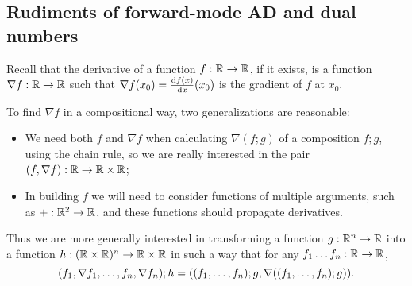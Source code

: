 

\subsection{Rudiments of forward-mode AD and dual numbers}

Recall that the derivative of a function $f:\mathbb{R}\to \mathbb{R}$, if it exists, is a function
$\nabla f:\mathbb{R}\to \mathbb{R}$ such that $\nabla f(x_0)=\frac {\mathop{}\!\mathrm{d} f(x)}{\mathop{}\!\mathrm{d} x}(x_0)$ is the gradient of $f$ at $x_0$. 

To find $\nabla f$ in a compositional way, two generalizations are reasonable:
\begin{itemize}
\item We need both $f$ and $\nabla f$ when calculating $\nabla (f;g)$
of a composition $f;g$, using the chain rule, so we are really interested in the pair $(f,\nabla f):\mathbb{R}\to \mathbb{R}\times \mathbb{R}$;
\item In building $f$ we will need to consider functions of multiple arguments, such as $+:\mathbb{R}^2\to \mathbb{R}$, and these functions should propagate derivatives.
\end{itemize}
Thus we are more generally interested in transforming a function $g:\mathbb{R}^n\to \mathbb{R}$ into a function
$h:(\mathbb{R}\times \mathbb{R})^n\to \mathbb{R}\times \mathbb{R}$ in such a way that for any
$f_1\dots f_n:\mathbb{R}\to\mathbb{R}$, 
\begin{equation}
  \label{eqn:dualnumber}
  (f_1,\nabla f_1,\dots, f_n,\nabla f_n);h
  =
  ((f_1,\dots, f_n);g,\nabla ((f_1, \dots, f_n);g))\text.
\end{equation}

